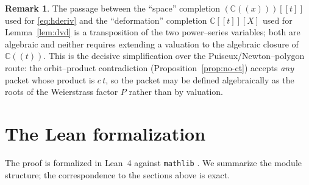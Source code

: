 \documentclass[11pt,reqno]{amsart}
\theoremstyle{plain}
\theoremstyle{definition}
\newtheorem{remark}[theorem]{Remark}
\newcommand{\C}{\mathbb{C}}
\begin{document}
\begin{remark}
The passage between the ``space'' completion $(\C(\!(x)\!))[\![t]\!]$ used for \eqref{eq:hderiv} and the
``deformation'' completion $\C[\![t]\!][X]$ used for Lemma~\ref{lem:dvd} is a transposition of the two
power--series variables; both are algebraic and neither requires extending a valuation to the algebraic
closure of $\C(\!(t)\!)$. This is the decisive simplification over the Puiseux/Newton--polygon route: the
orbit--product contradiction (Proposition~\ref{prop:no-ct}) accepts \emph{any} packet whose product is
$c\,t$, so the packet may be defined algebraically as the roots of the Weierstrass factor $P$ rather
than by valuation.
\end{remark}

\section{The Lean formalization}\label{sec:lean}

The proof is formalized in Lean~4 against \texttt{mathlib} \cite{mathlib}. We summarize the module
structure; the correspondence to the sections above is exact.
\end{document}
